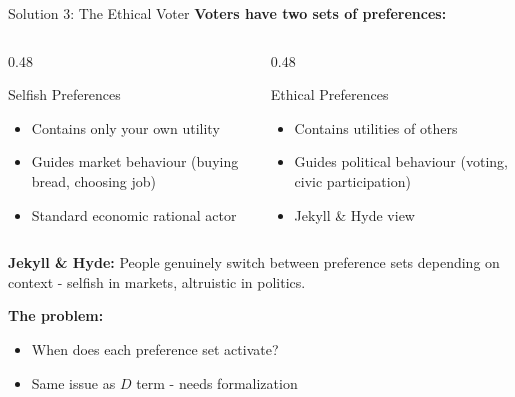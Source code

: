 \documentclass[10pt]{beamer}
\begin{document}
\begin{frame}{Solution 3: The Ethical Voter}
\textbf{Voters have two sets of preferences:}



\begin{columns}[T]
\begin{column}{0.48\textwidth}
\begin{block}{Selfish Preferences}
\footnotesize
\begin{itemize}
\item Contains only your own utility
\item Guides market behaviour (buying bread, choosing job)
\item Standard economic rational actor
\end{itemize}
\end{block}
\end{column}

\begin{column}{0.48\textwidth}
\begin{block}{Ethical Preferences}
\footnotesize
\begin{itemize}
\item Contains utilities of others
\item Guides political behaviour (voting, civic participation)
\item Jekyll \& Hyde view
\end{itemize}
\end{block}
\end{column}
\end{columns}



\textbf{Jekyll \& Hyde:} People genuinely switch between preference sets depending on context - selfish in markets, altruistic in politics.



\textbf{The problem:}
\begin{itemize}
\item When does each preference set activate?
\item Same issue as $D$ term - needs formalization
\end{itemize}
\end{frame}
\end{document}

